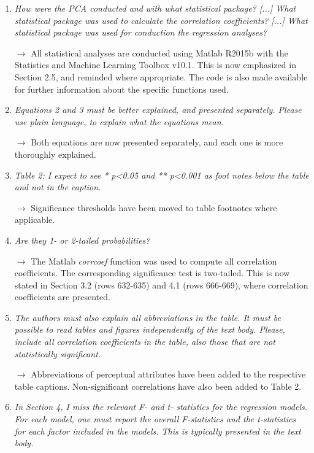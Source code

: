 \documentclass[10pt]{article}
\begin{document}
\begin{enumerate}
\item \emph{How were the PCA conducted and with what statistical package? [...] What statistical package was used to calculate the correlation coefficients? [...] What statistical package was used for conduction the regression analyses?}

$\rightarrow$ All statistical analyses are conducted using Matlab R2015b with the Statistics and Machine Learning Toolbox v10.1. This is now emphasized in Section 2.5, and reminded where appropriate. The code is also made available for further information about the specific functions used.

\item \emph{Equations 2 and 3 must be better explained, and presented separately. Please use plain language, to explain what the equations mean.}

$\rightarrow$ Both equations are now presented separately, and each one is more thoroughly explained.

\item \emph{Table 2: I expect to see * p<0.05 and ** p<0.001 as foot notes below the table and not in the caption.}

$\rightarrow$ Significance thresholds have been moved to table footnotes where applicable.

\item \emph{Are they 1- or 2-tailed probabilities?}

$\rightarrow$ The Matlab \textit{corrcoef} function was used to compute all correlation coefficients. The corresponding significance test is two-tailed. This is now stated in Section 3.2 (rows 632-635) and 4.1 (rows 666-669), where correlation coefficients are presented.

\item \emph{The authors must also explain all abbreviations in the table. It must be possible to read tables and figures independently of the text body. Please, include all correlation coefficients in the table, also those that are not statistically significant.}

$\rightarrow$ Abbreviations of perceptual attributes have been added to the respective table captions. Non-significant correlations have also been added to Table 2.

\item \emph{In Section 4, I miss the relevant F- and t- statistics for the regression models. For each model, one must report the overall F-statistics and the t-statistics for each factor included in the models. This is typically presented in the text body.}


\end{enumerate}
\end{document}
